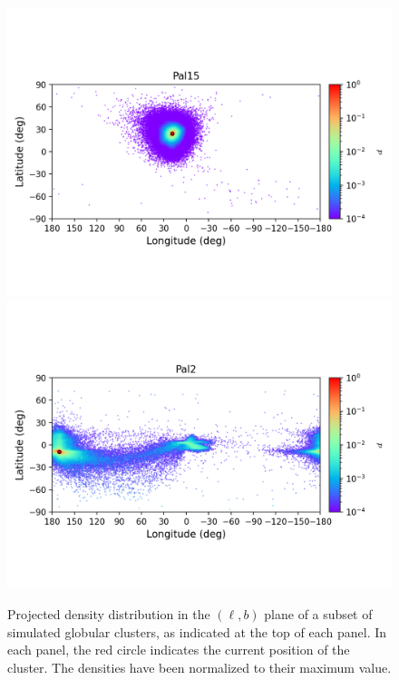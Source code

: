 \begin{figure}
\begin{center}
                \includegraphics[clip=true, trim = 0mm 20mm 0mm 10mm, width=1\columnwidth]{images/error_plots_Pal15.png}
                \includegraphics[clip=true, trim = 0mm 20mm 0mm 10mm, width=1\columnwidth]{images/error_plots_Pal2.png}
            \end{center}
            \caption[]{Projected density distribution in the $(\ell, b)$ plane of a subset of simulated globular clusters, as indicated at the top of each panel. In each panel, the red circle indicates the current position of the cluster. The densities have been normalized to their maximum value.}\label{stream17}
        \end{figure}
        
